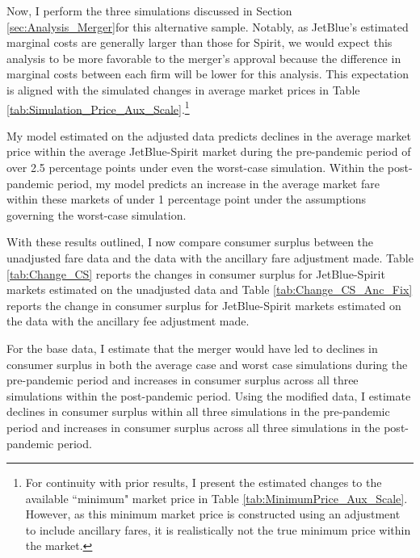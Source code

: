 \documentclass{article}
\begin{document}
    Now, I perform the three simulations discussed in Section \ref{sec:Analysis_Merger}for this alternative sample. Notably, as JetBlue's estimated marginal costs are generally larger than those for Spirit, we would expect this analysis to be more favorable to the merger's approval because the difference in marginal costs between each firm will be lower for this analysis. This expectation is aligned with the simulated changes in average market prices in Table \ref{tab:Simulation_Price_Aux_Scale}.\footnote{For continuity with prior results, I present the estimated changes to the available ``minimum" market price in Table \ref{tab:MinimumPrice_Aux_Scale}. However, as this minimum market price is constructed using an adjustment to include ancillary fares, it is realistically not the true minimum price within the market.}  

    My model estimated on the adjusted data predicts declines in the average market price within the average JetBlue-Spirit market during the pre-pandemic period of over 2.5 percentage points under even the worst-case simulation. Within the post-pandemic period, my model predicts an increase in the average market fare within these markets of under 1 percentage point under the assumptions governing the worst-case simulation. 

    With these results outlined, I now compare consumer surplus between the unadjusted fare data and the data with the ancillary fare adjustment made. Table \ref{tab:Change_CS} reports the changes in consumer surplus for JetBlue-Spirit markets estimated on the unadjusted data and Table \ref{tab:Change_CS_Anc_Fix} reports the change in consumer surplus for JetBlue-Spirit markets estimated on the data with the ancillary fee adjustment made. 

    For the base data, I estimate that the merger would have led to declines in consumer surplus in both the average case and worst case simulations during the pre-pandemic period and increases in consumer surplus across all three simulations within the post-pandemic period. Using the modified data, I estimate declines in consumer surplus within all three simulations in the pre-pandemic period and increases in consumer surplus across all three simulations in the post-pandemic period. 

    
\end{document}
